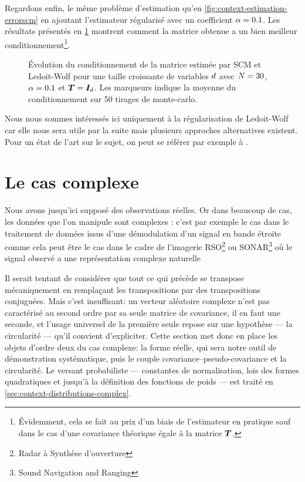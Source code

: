 Regardons enfin, le même problème d'estimation qu'en \cref{fig:context-estimation-errorscm} en ajoutant l'estimateur régularisé avec un coefficient $\alpha=0.1$. Les résultats présentés en \cref{fig:context-estimation-condlwf} montrent comment la matrice obtenue a un bien meilleur conditionnement\footnote{\'Evidemment, cela se fait au prix d'un biais de l'estimateur en pratique sauf dans le cas d'une covariance théorique égale à la matrice $\boldsymbol{T}$.}.


\begin{figure}[h]
  \begin{center}
        
      \end{center}
  \provLwfcondQR[.5cm]
  \caption{\'Evolution du conditionnement de la matrice estimée par SCM et Ledoit-Wolf pour une taille croissante de variables $d$ avec $N=30$, $\alpha=0.1$ et $\boldsymbol{T}=\boldsymbol{I}_{d}$. Les marqueurs indique la moyenne du conditionnement sur 50 tirages de monte-carlo. \provLwfcond}
  \label{fig:context-estimation-condlwf}
\end{figure}



Nous nous sommes intéressés ici uniquement à la régularisation de Ledoit-Wolf car elle nous sera utile par la suite mais plusieurs approches alternatives existent. Pour un état de l'art sur le sujet, on peut se référer par exemple à .


\section{Le cas complexe}
\label{sec:context-definition-complex}

Nous avons jusqu'ici supposé des observations réelles. Or dans beaucoup de cas, les données que l'on manipule sont complexes : c'est par exemple le cas dans le traitement de données issus d'une démodulation d'un signal en bande étroite comme cela peut être le cas dans le cadre de l'imagerie RSO\footnote{Radar à Synthèse d'ouverture} ou SONAR\footnote{Sound Navigation and Ranging} où le signal observé a une représentation complexe naturelle

Il serait tentant de considérer que tout ce qui précède se transpose mécaniquement en remplaçant les transpositions par des transpositions conjuguées. Mais c'est insuffisant: un vecteur aléatoire complexe n'est pas caractérisé au second ordre par sa seule matrice de covariance, il en faut une seconde, et l'usage universel de la première seule repose sur une hypothèse --- la circularité --- qu'il convient d'expliciter. Cette section met donc en place les objets d'ordre deux du cas complexe: la forme réelle, qui sera notre outil de démonstration systématique, puis le couple covariance--pseudo-covariance et la circularité. Le versant probabiliste --- constantes de normalisation, lois des formes quadratiques et jusqu'à la définition des fonctions de poids --- est traité en \cref{sec:context-distributions-complex}.

